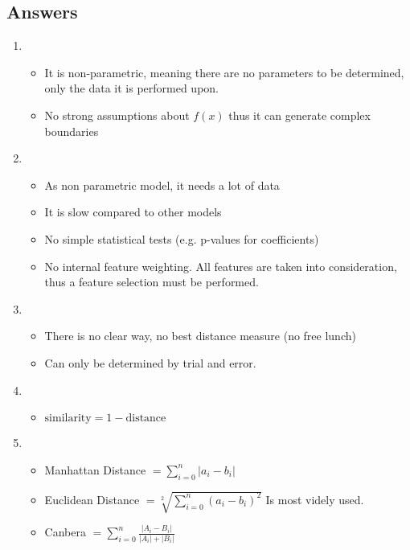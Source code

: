 \documentclass[11pt]{article}
\begin{document}
    \subsection*{Answers}
    \begin{enumerate}
        \item \begin{itemize}
                  \item It is non-parametric, meaning there are no parameters to be determined, only the data it is performed
                  upon.
                  \item No strong assumptions about $f(x)$ thus it can generate complex boundaries
        \end{itemize}
        \item \begin{itemize}
                  \item As non parametric model, it needs a lot of data
                  \item It is slow compared to other models
                  \item No simple statistical tests (e.g. p-values for coefficients)
                  \item No internal feature weighting.
                  All features are taken into consideration, thus a feature selection must be performed.
        \end{itemize}
        \item \begin{itemize}
                  \item There is no clear way, no best distance measure (no free lunch)
                  \item Can only be determined by trial and error.
        \end{itemize}
        \item \begin{itemize}
                  \item $\text{similarity} = 1 - \text{distance}$
        \end{itemize}
        \item \begin{itemize}
                  \item Manhattan Distance $= \sum_{i=0}^{n} |a_i - b_i| $
                  \item Euclidean Distance $= \sqrt[2]{\sum_{i=0}^{n} (a_i - b_i)^2 }$
                  Is most videly used.
                  \item Canbera $= \sum_{i=0}^{n} \frac{|A_i - B_i|}{|A_i| + |B_i|}$

\end{itemize}
\end{enumerate}
\end{document}
